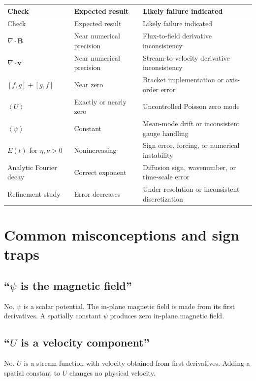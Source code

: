 \documentclass[11pt]{article}
\newcommand{\vect}[1]{\bm{#1}}
\newcommand{\average}[1]{\left\langle #1\right\rangle}
\begin{document}
\begin{longtable}{p{}p{}p{}}
\toprule
Check & Expected result & Likely failure indicated \\
\midrule
\endfirsthead
\toprule
Check & Expected result & Likely failure indicated \\
\midrule
\endhead
$\nabla\cdot\vect{B}$ & Near numerical precision & Flux-to-field derivative inconsistency \\
$\nabla\cdot\vect{v}$ & Near numerical precision & Stream-to-velocity derivative inconsistency \\
$[f,g]+[g,f]$ & Near zero & Bracket implementation or axis-order error \\
$\average{U}$ & Exactly or nearly zero & Uncontrolled Poisson zero mode \\
$\average{\psi}$ & Constant & Mean-mode drift or inconsistent gauge handling \\
$E(t)$ for $\eta,\nu>0$ & Nonincreasing & Sign error, forcing, or numerical instability \\
Analytic Fourier decay & Correct exponent & Diffusion sign, wavenumber, or time-scale error \\
Refinement study & Error decreases & Under-resolution or inconsistent discretization \\
\bottomrule
\end{longtable}

\section{Common misconceptions and sign traps}
\label{sec:misconceptions}

\subsection{``$\psi$ is the magnetic field''}

No. $\psi$ is a scalar potential. The in-plane magnetic field is made from its first derivatives. A spatially constant $\psi$ produces zero in-plane magnetic field.

\subsection{``$U$ is a velocity component''}

No. $U$ is a stream function with velocity obtained from first derivatives. Adding a spatial constant to $U$ changes no physical velocity.
\end{document}
